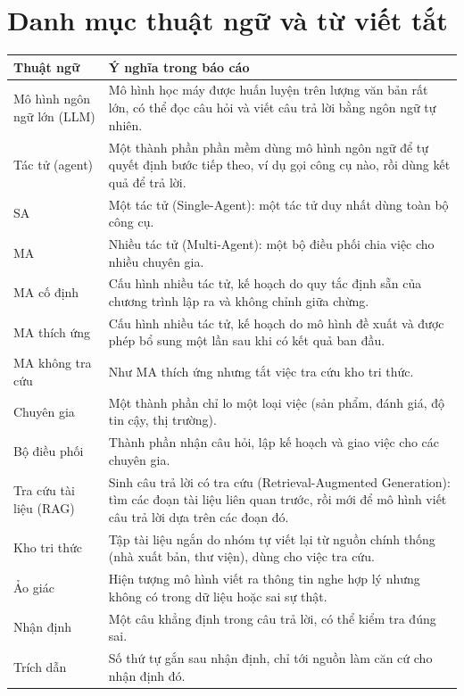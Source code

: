 \chapter*{Danh mục thuật ngữ và từ viết tắt}

{\cobang
\begin{longtable}{P{3.6cm}P{11.6cm}}
\toprule
\textbf{Thuật ngữ} & \textbf{Ý nghĩa trong báo cáo}\\
\midrule
\endhead
Mô hình ngôn ngữ lớn (LLM) & Mô hình học máy được huấn luyện trên lượng văn bản rất lớn, có thể đọc câu hỏi và viết câu trả lời bằng ngôn ngữ tự nhiên.\\
Tác tử (agent) & Một thành phần phần mềm dùng mô hình ngôn ngữ để tự quyết định bước tiếp theo, ví dụ gọi công cụ nào, rồi dùng kết quả để trả lời.\\
SA & Một tác tử (Single-Agent): một tác tử duy nhất dùng toàn bộ công cụ.\\
MA & Nhiều tác tử (Multi-Agent): một bộ điều phối chia việc cho nhiều chuyên gia.\\
MA cố định & Cấu hình nhiều tác tử, kế hoạch do quy tắc định sẵn của chương trình lập ra và không chỉnh giữa chừng.\\
MA thích ứng & Cấu hình nhiều tác tử, kế hoạch do mô hình đề xuất và được phép bổ sung một lần sau khi có kết quả ban đầu.\\
MA không tra cứu & Như MA thích ứng nhưng tắt việc tra cứu kho tri thức.\\
Chuyên gia & Một thành phần chỉ lo một loại việc (sản phẩm, đánh giá, độ tin cậy, thị trường).\\
Bộ điều phối & Thành phần nhận câu hỏi, lập kế hoạch và giao việc cho các chuyên gia.\\
Tra cứu tài liệu (RAG) & Sinh câu trả lời có tra cứu (Retrieval-Augmented Generation): tìm các đoạn tài liệu liên quan trước, rồi mới để mô hình viết câu trả lời dựa trên các đoạn đó.\\
Kho tri thức & Tập tài liệu ngắn do nhóm tự viết lại từ nguồn chính thống (nhà xuất bản, thư viện), dùng cho việc tra cứu.\\
Ảo giác & Hiện tượng mô hình viết ra thông tin nghe hợp lý nhưng không có trong dữ liệu hoặc sai sự thật.\\
Nhận định & Một câu khẳng định trong câu trả lời, có thể kiểm tra đúng sai.\\
Trích dẫn & Số thứ tự gắn sau nhận định, chỉ tới nguồn làm căn cứ cho nhận định đó.\\

\end{longtable}}
